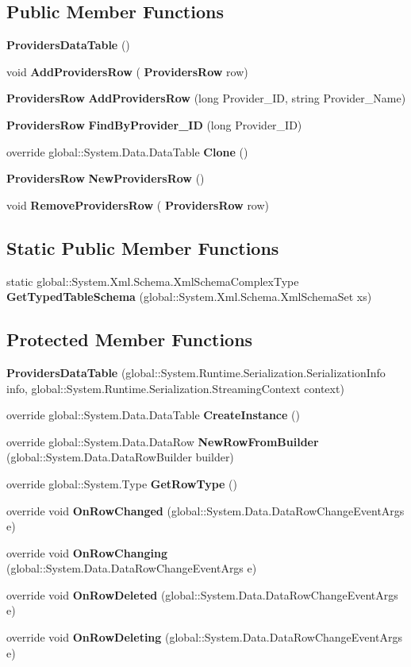 \subsection*{Public Member Functions}
\begin{DoxyCompactItemize}
\item 
\textbf{ Providers\+Data\+Table} ()
\item 
void \textbf{ Add\+Providers\+Row} (\textbf{ Providers\+Row} row)
\item 
\textbf{ Providers\+Row} \textbf{ Add\+Providers\+Row} (long Provider\+\_\+\+ID, string Provider\+\_\+\+Name)
\item 
\textbf{ Providers\+Row} \textbf{ Find\+By\+Provider\+\_\+\+ID} (long Provider\+\_\+\+ID)
\item 
override global\+::\+System.\+Data.\+Data\+Table \textbf{ Clone} ()
\item 
\textbf{ Providers\+Row} \textbf{ New\+Providers\+Row} ()
\item 
void \textbf{ Remove\+Providers\+Row} (\textbf{ Providers\+Row} row)
\end{DoxyCompactItemize}
\subsection*{Static Public Member Functions}
\begin{DoxyCompactItemize}
\item 
static global\+::\+System.\+Xml.\+Schema.\+Xml\+Schema\+Complex\+Type \textbf{ Get\+Typed\+Table\+Schema} (global\+::\+System.\+Xml.\+Schema.\+Xml\+Schema\+Set xs)
\end{DoxyCompactItemize}
\subsection*{Protected Member Functions}
\begin{DoxyCompactItemize}
\item 
\textbf{ Providers\+Data\+Table} (global\+::\+System.\+Runtime.\+Serialization.\+Serialization\+Info info, global\+::\+System.\+Runtime.\+Serialization.\+Streaming\+Context context)
\item 
override global\+::\+System.\+Data.\+Data\+Table \textbf{ Create\+Instance} ()
\item 
override global\+::\+System.\+Data.\+Data\+Row \textbf{ New\+Row\+From\+Builder} (global\+::\+System.\+Data.\+Data\+Row\+Builder builder)
\item 
override global\+::\+System.\+Type \textbf{ Get\+Row\+Type} ()
\item 
override void \textbf{ On\+Row\+Changed} (global\+::\+System.\+Data.\+Data\+Row\+Change\+Event\+Args e)
\item 
override void \textbf{ On\+Row\+Changing} (global\+::\+System.\+Data.\+Data\+Row\+Change\+Event\+Args e)
\item 
override void \textbf{ On\+Row\+Deleted} (global\+::\+System.\+Data.\+Data\+Row\+Change\+Event\+Args e)
\item 
override void \textbf{ On\+Row\+Deleting} (global\+::\+System.\+Data.\+Data\+Row\+Change\+Event\+Args e)
\end{DoxyCompactItemize}
